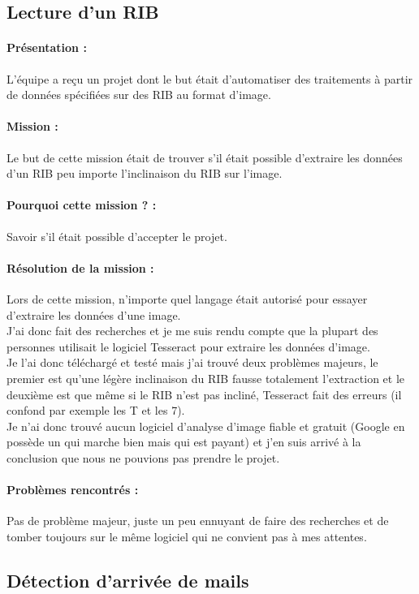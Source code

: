 \documentclass[a4paper,twoside,12pt,openright]{report}
\begin{document}
\subsection{Lecture d'un RIB}
\vspace{1cm}
\paragraph {Présentation :} 
L'équipe a reçu un projet dont le but était d'automatiser des traitements à partir de données spécifiées sur des RIB au format d'image.
\paragraph {Mission :}
Le but de cette mission était de trouver s'il était possible d'extraire les données d'un RIB peu importe l'inclinaison du RIB sur l'image.
\paragraph {Pourquoi cette mission ? :}
Savoir s'il était possible d'accepter le projet.
\paragraph {Résolution de la mission :}
Lors de cette mission, n'importe quel langage était autorisé pour essayer d'extraire les données d'une image.\\
J'ai donc fait des recherches et je me suis rendu compte que la plupart des personnes utilisait le logiciel Tesseract pour extraire les données d'image.\\
Je l'ai donc téléchargé et testé mais j'ai trouvé deux problèmes majeurs, le premier est qu'une légère inclinaison du RIB fausse totalement l'extraction et le deuxième est que même si le RIB n'est pas incliné, Tesseract fait des erreurs (il confond par exemple les T et les 7).\\
Je n'ai donc trouvé aucun logiciel d'analyse d'image fiable et gratuit (Google en possède un qui marche bien mais qui est payant) et j'en suis arrivé à la conclusion que nous ne pouvions pas prendre le projet.
\paragraph {Problèmes rencontrés :}
Pas de problème majeur, juste un peu ennuyant de faire des recherches et de tomber toujours sur le même logiciel qui ne convient pas à mes attentes.
\newpage
\subsection{Détection d'arrivée de mails}
\vspace{1cm}
\end{document}
